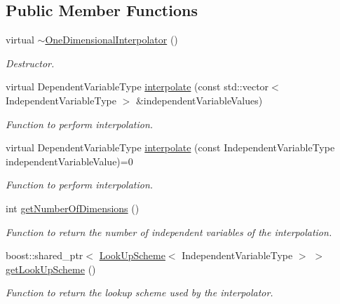 \subsection*{Public Member Functions}
\begin{DoxyCompactItemize}
\item 
virtual \hyperlink{classtudat_1_1interpolators_1_1OneDimensionalInterpolator_ad359d0d7a6f229fb9f65260cb3bd2779}{$\sim$\+One\+Dimensional\+Interpolator} ()
\begin{DoxyCompactList}\small\item\em Destructor. \end{DoxyCompactList}\item 
virtual Dependent\+Variable\+Type \hyperlink{classtudat_1_1interpolators_1_1OneDimensionalInterpolator_aaf340e39d13f8b31cab6887b48427918}{interpolate} (const std\+::vector$<$ Independent\+Variable\+Type $>$ \&independent\+Variable\+Values)
\begin{DoxyCompactList}\small\item\em Function to perform interpolation. \end{DoxyCompactList}\item 
virtual Dependent\+Variable\+Type \hyperlink{classtudat_1_1interpolators_1_1OneDimensionalInterpolator_a1756cce160465357493e18221aa49dee}{interpolate} (const Independent\+Variable\+Type independent\+Variable\+Value)=0
\begin{DoxyCompactList}\small\item\em Function to perform interpolation. \end{DoxyCompactList}\item 
int \hyperlink{classtudat_1_1interpolators_1_1OneDimensionalInterpolator_a149d4201dc4869276bd2961d17e5acdd}{get\+Number\+Of\+Dimensions} ()
\begin{DoxyCompactList}\small\item\em Function to return the number of independent variables of the interpolation. \end{DoxyCompactList}\item 
boost\+::shared\+\_\+ptr$<$ \hyperlink{classtudat_1_1interpolators_1_1LookUpScheme}{Look\+Up\+Scheme}$<$ Independent\+Variable\+Type $>$ $>$ \hyperlink{classtudat_1_1interpolators_1_1OneDimensionalInterpolator_aa26fe6cb1401a8ccb2fab17321f7f41c}{get\+Look\+Up\+Scheme} ()
\begin{DoxyCompactList}\small\item\em Function to return the lookup scheme used by the interpolator. \end{DoxyCompactList}\item 

\end{DoxyCompactItemize}
